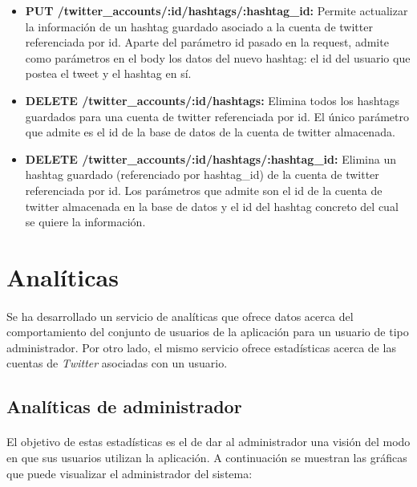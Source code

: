 \documentclass[a4paper]{article}
\begin{document}
\begin{itemize}
		\item \textbf{PUT /twitter\_accounts/:id/hashtags/:hashtag\_id:} Permite actualizar la información de un hashtag guardado asociado a la cuenta de twitter referenciada por id. Aparte del parámetro id pasado en la request, admite como parámetros en el body los datos del nuevo hashtag: el id del usuario que postea el tweet y el hashtag en sí.
		
		\item \textbf{DELETE /twitter\_accounts/:id/hashtags:} Elimina todos los hashtags guardados para una cuenta de twitter referenciada por id. El único parámetro que admite es el id de la base de datos de la cuenta de twitter almacenada.
		
		\item \textbf{DELETE /twitter\_accounts/:id/hashtags/:hashtag\_id:} Elimina un hashtag guardado (referenciado por hashtag\_id) de la cuenta de twitter referenciada por id. Los parámetros que admite son el id de la cuenta de twitter almacenada en la base de datos y el id del hashtag concreto del cual se quiere la información.
	\end{itemize}
\section{Analíticas}

	\paragraph{} Se ha desarrollado un servicio de analíticas que ofrece datos acerca del comportamiento del conjunto de usuarios de la aplicación para un usuario de tipo administrador. Por otro lado, el mismo servicio ofrece estadísticas acerca de las cuentas de \textit{Twitter} asociadas con un usuario.
	
	\subsection{Analíticas de administrador}
	
		\paragraph{} El objetivo de estas estadísticas es el de dar al administrador una visión del modo en que sus usuarios utilizan la aplicación. A continuación se muestran las gráficas que puede visualizar el administrador del sistema:
		
\end{document}
